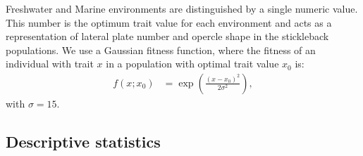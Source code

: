 \documentclass{article}
\newcommand{\plr}[1]{\todo[linecolor=blue,backgroundcolor=blue!25,bordercolor=blue]{#1}}
\begin{document}
Freshwater and Marine environments are distinguished by a single numeric value. 
This number is the optimum trait value for each environment
and acts as a representation of lateral plate number and opercle shape in the stickleback populations.
We use a Gaussian fitness function, 
where the fitness of an individual with trait $x$ in a population with optimal trait value $x_0$ is:
\begin{align}
    f(x; x_0) &= \exp\left(\frac{(x - x_0)^2 }{ 2 \sigma^2}\right),
\end{align}
with $\sigma = 15$.


    




\subsection*{Descriptive statistics}
\end{document}
